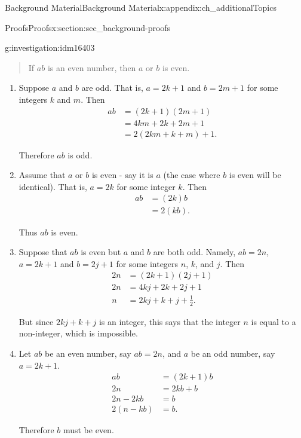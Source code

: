 \documentclass[oneside,10pt,]{book}
\numberwithin{equation}{chapter}
\newcommand{\amp}{&}
\begin{document}
\begin{appendixptx}{Background Material}{}{Background Material}{}{}{x:appendix:ch_additionalTopics}
\begin{sectionptx}{Proofs}{}{Proofs}{}{}{x:section:sec_background-proofs}
\begin{introduction}{}
\begin{investigation}{}{g:investigation:idm16403}
\begin{quote}%
If \(a b\) is an even number, then \(a\) or \(b\) is even.%
\end{quote}
%
\begin{enumerate}
\item{}Suppose \(a\) and \(b\) are odd. That is, \(a=2k+1\) and \(b=2m+1\) for some integers \(k\) and \(m\). Then%
\begin{align*}
ab \amp =(2k+1)(2m+1)\\
\amp =4km+2k+2m+1\\
\amp =2(2km+k+m)+1.
\end{align*}
%
\par
Therefore \(ab\) is odd.%
\item{}Assume that \(a\) or \(b\) is even - say it is \(a\) (the case where \(b\) is even will be identical). That is, \(a=2k\) for some integer \(k\). Then%
\begin{align*}
ab \amp =(2k)b\\
\amp =2(kb).
\end{align*}
%
\par
Thus \(ab\) is even.%
\item{}Suppose that \(ab\) is even but \(a\) and \(b\) are both odd. Namely, \(ab = 2n\), \(a=2k+1\) and \(b=2j+1\) for some integers \(n\), \(k\), and \(j\). Then%
\begin{align*}
2n \amp =(2k+1)(2j+1)\\
2n \amp =4kj+2k+2j+1\\
n \amp = 2kj+k+j+\frac{1}{2}.
\end{align*}
%
\par
But since \(2kj+k+j\) is an integer, this says that the integer \(n\) is equal to a non-integer, which is impossible.%
\item{}Let \(ab\) be an even number, say \(ab=2n\), and \(a\) be an odd number, say \(a=2k+1\).%
\begin{align*}
ab \amp =(2k+1)b\\
2n \amp =2kb+b\\
2n-2kb\amp =b\\
2(n-kb)\amp =b.
\end{align*}
%
\par
Therefore \(b\) must be even.%
\end{enumerate}
%
\end{investigation}

\end{introduction}
\end{sectionptx}
\end{appendixptx}
\end{document}
